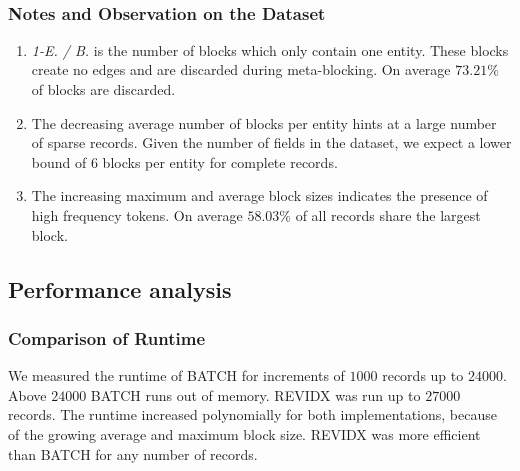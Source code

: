 \documentclass[a4paper,12pt]{article}
\begin{document}
\begin{center}
\scalebox{0.90}{} \\
\end{center}

\subsubsection{Notes and Observation on the Dataset}
\begin{enumerate}
  \item \emph{1-E. / B.} is the number of blocks which only contain one entity. These blocks create no edges and are discarded during meta-blocking. On average $73.21\%$ of blocks are discarded.
  \item The decreasing average number of blocks per entity hints at a large number of sparse records. Given the number of fields in the dataset, we expect a lower bound of $6$ blocks per entity for complete records.
  \item The increasing maximum and average block sizes indicates the presence of high frequency tokens. On average $58.03\%$ of all records share the largest block. 
\end{enumerate}

\newpage
\subsection{Performance analysis}

\subsubsection{Comparison of Runtime}
We measured the runtime of BATCH for increments of $1000$ records up to $24000$. Above $24000$ BATCH runs out of memory. REVIDX was run up to $27000$ records.
The runtime increased polynomially for both implementations, because of the growing average and maximum block size. REVIDX was more efficient than BATCH for any number of records. 

\begin{center}
\end{center}
\end{document}
